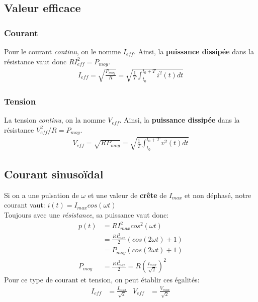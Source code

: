 \documentclass{report}
\begin{document}
\subsection{Valeur efficace}

\subsubsection{Courant}
Pour le courant \textit{continu}, on le nomme $I_{eff}$. Ainsi, la \textbf{puissance dissipée} dans la résistance vaut donc $R I_{eff}^2 = P_{moy}$.
\begin{align*}
I_{eff} = \sqrt{\frac{P_{moy}}{R}} = \sqrt{\frac{1}{T}\int_{t_0}^{t_0 + T} i^2 (t) dt}
\end{align*}

\subsubsection{Tension}
La tension \textit{continu}, on la nomme $V_{eff}$. Ainsi, la \textbf{puissance dissipée} dans la résistance $V_{eff}^2 / R = P_{moy}$.
\begin{align*}
V_{eff} = \sqrt{R P_{moy}} = \sqrt{\frac{1}{T}\int_{t_0}^{t_0 + T} v^2 (t) dt}
\end{align*}

\subsection{Courant sinusoïdal}
Si on a une pulsation de $\omega$ et une valeur de \textbf{crête} de $I_{max}$ et non déphasé, notre courant vaut: $i(t)= I_{max} cos(\omega t)$\\
Toujours avec une \textit{résistance}, sa puissance vaut donc:
\begin{align*}
p(t) &= R I_{max}^2 cos^2(\omega t)\\
&= \frac{R I_{max}^2}{2} (cos(2 \omega t) + 1)\\
&= P_{moy} (cos (2 \omega t ) +1 )\\
P_{moy} &= \frac{R I_{max}^2}{2} = R \left( \frac{I_{max}}{\sqrt{2}} \right)^2
\end{align*}
Pour ce type de courant et tension, on peut établir ces égalités:
\begin{align*}
I_{eff} &= \frac{I_{max}}{\sqrt{2}} & V_{eff} &= \frac{V_{max}}{\sqrt{2}}
\end{align*}
\end{document}
